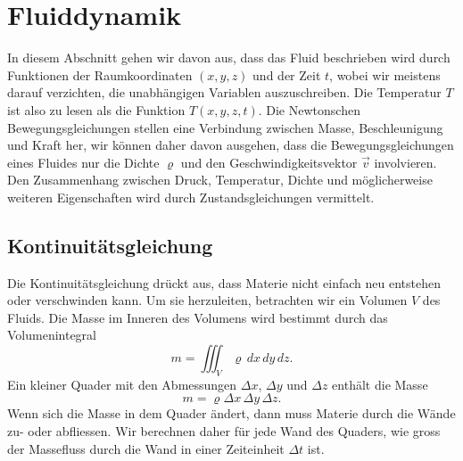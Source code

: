 %
%
%
\section{Fluiddynamik}
%
%
%
In diesem Abschnitt gehen wir davon aus, dass das Fluid beschrieben wird
durch Funktionen der Raumkoordinaten $(x,y,z)$ und der Zeit $t$,
wobei wir meistens darauf verzichten, die unabhängigen Variablen
auszuschreiben.
Die Temperatur $T$ ist also zu lesen als die Funktion $T(x,y,z,t)$.
Die Newtonschen Bewegungsgleichungen stellen eine Verbindung zwischen
Masse, Beschleunigung und Kraft her, wir können daher davon ausgehen,
dass die Bewegungsgleichungen eines Fluides nur die Dichte $\varrho$ und 
den Geschwindigkeitsvektor $\vec{v}$ involvieren.
Den Zusammenhang zwischen Druck, Temperatur, Dichte und möglicherweise
weiteren Eigenschaften wird durch Zustandsgleichungen vermittelt.

\subsection{Kontinuitätsgleichung}
Die Kontinuitätsgleichung drückt aus, dass
Materie nicht einfach neu entstehen oder verschwinden kann.
Um sie herzuleiten, betrachten wir ein Volumen $V$ des Fluids.
Die Masse im Inneren des Volumens wird bestimmt durch das Volumenintegral
\[
m
=
\iiint_V \varrho \,dx\,dy\,dz.
\]
Ein kleiner Quader mit den Abmessungen $\Delta x$, $\Delta y$
und $\Delta z$ enthält die Masse 
\[
m = \varrho \Delta x \,\Delta y \, \Delta z.
\]
Wenn sich die Masse in dem Quader ändert, dann muss Materie durch die
Wände zu- oder abfliessen.
Wir berechnen daher für jede Wand des Quaders, wie gross der Massefluss
durch die Wand in einer Zeiteinheit $\Delta t$ ist.

